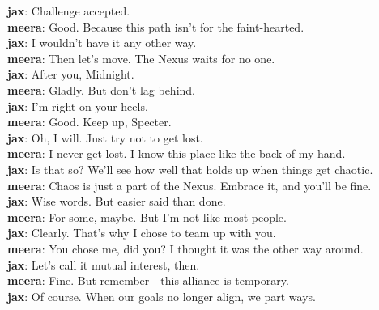 \documentclass[12pt]{book}
\begin{document}
\textbf{jax}: Challenge accepted.\\

\textbf{meera}: Good. Because this path isn't for the faint-hearted.\\

\textbf{jax}: I wouldn't have it any other way.\\

\textbf{meera}: Then let's move. The Nexus waits for no one.\\

\textbf{jax}: After you, Midnight.\\

\textbf{meera}: Gladly. But don't lag behind.\\

\textbf{jax}: I'm right on your heels.\\

\textbf{meera}: Good. Keep up, Specter.\\

\textbf{jax}: Oh, I will. Just try not to get lost.\\

\textbf{meera}: I never get lost. I know this place like the back of my hand.\\

\textbf{jax}: Is that so? We'll see how well that holds up when things get chaotic.\\

\textbf{meera}: Chaos is just a part of the Nexus. Embrace it, and you'll be fine.\\

\textbf{jax}: Wise words. But easier said than done.\\

\textbf{meera}: For some, maybe. But I'm not like most people.\\

\textbf{jax}: Clearly. That's why I chose to team up with you.\\

\textbf{meera}: You chose me, did you? I thought it was the other way around.\\

\textbf{jax}: Let's call it mutual interest, then.\\

\textbf{meera}: Fine. But remember—this alliance is temporary.\\

\textbf{jax}: Of course. When our goals no longer align, we part ways.\\
\end{document}
